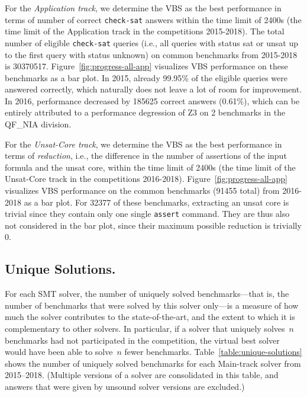 \documentclass[dvipsnames,table,twoside,11pt]{article}
\begin{document}
For the \emph{Application track}, we determine the VBS as the best performance
in terms of number of correct \texttt{check-sat} answers within the time limit
of 2400s (the time limit of the Application track in the competitions
2015-2018).
The total number of eligible \texttt{check-sat} queries (i.e., all queries with
status sat or unsat up to the first query with status unknown) on
common benchmarks from 2015-2018 is 30370517.
Figure~\ref{fig:progress-all-app} visualizes VBS performance on these
benchmarks as a bar plot.
In 2015, already 99.95\% of the eligible queries were answered correctly,
which naturally does not leave a lot of room for improvement.
In 2016, performance decreased by 185625 correct answers (0.61\%),
which can be entirely attributed to a performance degression
of Z3 on 2 benchmarks in the QF\_NIA division.

For the \emph{Unsat-Core track}, we determine the VBS as the best performance in
terms of \emph{reduction}, i.e., the difference in the number of assertions
of the input formula and the unsat core, within the time limit
of 2400s (the time limit of the Unsat-Core track in the competitions
2016-2018).
Figure~\ref{fig:progress-all-app} visualizes VBS performance on the common
benchmarks (91455 total) from 2016-2018 as a bar plot.
For 32377 of these benchmarks, extracting an unsat core is trivial since
they contain only one single \texttt{assert} command.
They are thus also not considered in the bar plot, since their maximum
possible reduction is trivially 0.


\subsection{Unique Solutions.}

For each SMT solver, the number of uniquely solved benchmarks---that
is, the number of benchmarks that were solved by this solver only---is
a measure of how much the solver contributes to the state-of-the-art,
and the extent to which it is complementary to other solvers.  In
particular, if a solver that uniquely solves~$n$ benchmarks had not
participated in the competition, the virtual best solver would have
been able to solve~$n$ fewer benchmarks.
Table~\ref{table:unique-solutions} shows the number of uniquely solved
benchmarks for each Main-track solver from 2015--2018.  (Multiple
versions of a solver are consolidated in this table, and answers that
were given by unsound solver versions are excluded.)
\end{document}
